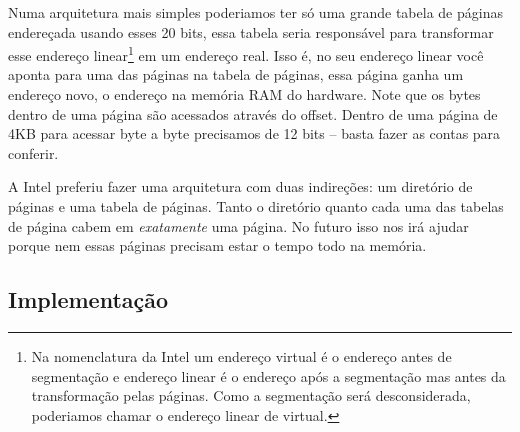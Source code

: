 \documentclass{article}
\begin{document}
Numa arquitetura mais simples poderiamos ter só uma grande tabela de páginas
endereçada usando esses 20 bits, essa tabela seria responsável para transformar
esse endereço linear\footnote{Na nomenclatura da Intel um endereço virtual é o
endereço antes de segmentação e endereço linear é o endereço após a segmentação
mas antes da transformação pelas páginas. Como a segmentação será
desconsiderada, poderiamos chamar o endereço linear de virtual.} em um endereço
real. Isso é, no seu endereço linear você aponta para uma das páginas na tabela
de páginas, essa página ganha um endereço novo, o endereço na memória RAM do
hardware. Note que os bytes dentro de uma página são acessados através do
offset. Dentro de uma página de 4KB para acessar byte a byte precisamos de 12
bits -- basta fazer as contas para conferir.

A Intel preferiu fazer uma arquitetura com duas indireções: um diretório de
páginas e uma tabela de páginas. Tanto o diretório quanto cada uma das tabelas
de página cabem em \emph{exatamente} uma página. No futuro isso nos irá ajudar
porque nem essas páginas precisam estar o tempo todo na memória.

\subsection{Implementação}
\end{document}
